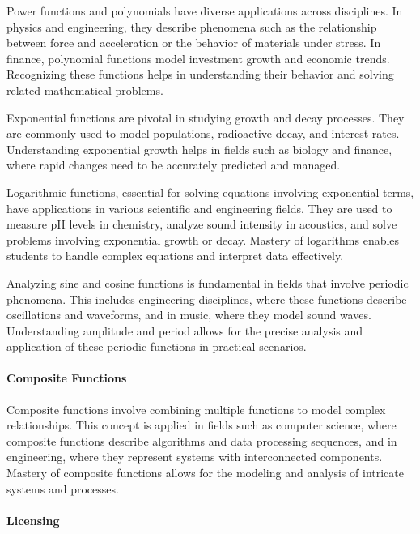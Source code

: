 Power functions and polynomials have diverse applications across disciplines. In physics and engineering, they describe phenomena such as the relationship between force and acceleration or the behavior of materials under stress. In finance, polynomial functions model investment growth and economic trends. Recognizing these functions helps in understanding their behavior and solving related mathematical problems.

Exponential functions are pivotal in studying growth and decay processes. They are commonly used to model populations, radioactive decay, and interest rates. Understanding exponential growth helps in fields such as biology and finance, where rapid changes need to be accurately predicted and managed.

Logarithmic functions, essential for solving equations involving exponential terms, have applications in various scientific and engineering fields. They are used to measure pH levels in chemistry, analyze sound intensity in acoustics, and solve problems involving exponential growth or decay. Mastery of logarithms enables students to handle complex equations and interpret data effectively.

Analyzing sine and cosine functions is fundamental in fields that involve periodic phenomena. This includes engineering disciplines, where these functions describe oscillations and waveforms, and in music, where they model sound waves. Understanding amplitude and period allows for the precise analysis and application of these periodic functions in practical scenarios.

\paragraph{Composite Functions}

Composite functions involve combining multiple functions to model complex relationships. This concept is applied in fields such as computer science, where composite functions describe algorithms and data processing sequences, and in engineering, where they represent systems with interconnected components. Mastery of composite functions allows for the modeling and analysis of intricate systems and processes.


\paragraph{Licensing}

